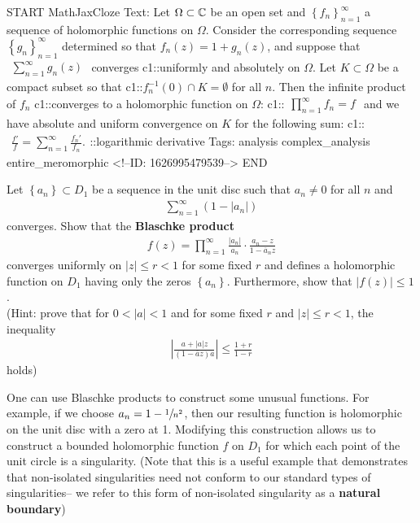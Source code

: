 \documentclass{memoir}
\begin{document}
\begin{anki}
START
MathJaxCloze
Text: Let \(\Omega \subset \mathbb{C}\) be an open set and \(\left\{ f_n \right\}_{n=1}^{\infty}\) a sequence of holomorphic functions on \(\Omega \).
Consider the corresponding sequence \(\left\{ g_n \right\}_{n=1}^{\infty}\) determined so that \(f_n(z) = 1 + g_n(z)\), and suppose that
\(\begin{align*}
  	\sum_{n=1}^{\infty} g_n(z)
  \end{align*}\)
converges {{c1::uniformly and absolutely on \(\Omega \)}}.
Let \(K\subset \Omega \) be a compact subset so that {{c1::\(f_n^{-1}(0)\cap K = \emptyset\)}} for all \(n\).
Then the infinite product of \(f_n\) {{c1::converges to a holomorphic function}} on \(\Omega \):
{{c1::\(\begin{align*}
        	\prod_{n=1}^{\infty} f_n = f 
        \end{align*}\)}}
and we have absolute and uniform convergence on \(K\) for the following sum:
{{c1::\(\begin{align*}
        	\frac{f'}{f} = \sum_{n=1}^{\infty} \frac{f_n'}{f_n}.
        \end{align*}\)::logarithmic derivative}} 
Tags: analysis complex_analysis entire_meromorphic
<!--ID: 1626995479539-->
END
\end{anki}


\begin{hw}
	Let \(\left\{ a_n \right\} \subset D_1 \) be a sequence in the unit disc such that \(a_n\neq 0\) for all \(n\) and
	\begin{align*}
		\sum_{n=1}^{\infty} (1-\left| a_n \right| )
	\end{align*}
	converges.
	Show that the \textbf{Blaschke product}
	\begin{align*}
		f(z) = \prod_{n=1}^{\infty} \frac{\left| a_n \right| }{a_n}\cdot \frac{a_n - z}{1 - \overline{a}_n z} 
	\end{align*}
	converges uniformly on \(\left| z \right| \leq r<1\) for some fixed \(r\) and defines a holomorphic function on \(D_1\) having only the zeros \(\left\{ a_n \right\} \).
	Furthermore, show that  \(\left| f(z) \right| \leq 1\).\\

	(Hint: prove that for \(0<\left| a \right| <1\) and for some fixed \(r\) and  \(\left| z \right| \leq r<1\), the inequality
	\begin{align*}
		\left| \frac{a + \left| a \right| z}{(1-\overline{a}z)a} \right| \leq \frac{1+r}{1-r}
	\end{align*}
	holds)
\end{hw}
One can use Blaschke products to construct some unusual functions.
For example, if we choose \(a_n = 1-\sfrac{1}{n^2}\), then our resulting function is holomorphic on the unit disc with a zero at 1.
Modifying this construction allows us to construct a bounded holomorphic function \(f\) on \(D_1\) for which each point of the unit circle is a singularity.
(Note that this is a useful example that demonstrates that non-isolated singularities need not conform to our standard types of singularities-- we refer to this form of non-isolated singularity as a \textbf{natural boundary})
\end{document}
